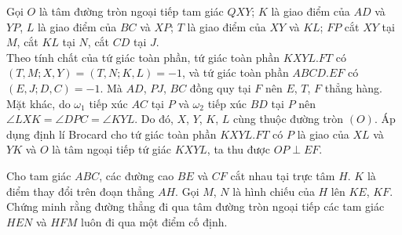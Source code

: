         \begin{solution}
            Gọi \(O\) là tâm đường tròn ngoại tiếp tam giác \(QXY\); \(K\) là giao điểm của \(AD\) và \(YP\), \(L\) là giao điểm của \(BC\) và \(XP\); \(T\) là giao điểm của \(XY\) và \(KL\); \(FP\) cắt \(XY\) tại \(M\), cắt \(KL\) tại \(N\), cắt \(CD\) tại \(J\).\\
            Theo tính chất của tứ giác toàn phần, tứ giác toàn phần \(KXYL.FT\) có \((T,M;X,Y) = (T,N;K,L) = -1\), và tứ giác toàn phần \(ABCD.EF\) có \((E,J;D,C) = -1\). Mà \(AD\), \(PJ\), \(BC\) đồng quy tại \(F\) nên \(E\), \(T\), \(F\) thẳng hàng.\\
            Mặt khác, do \(\omega_1\) tiếp xúc \(AC\) tại \(P\) và \(\omega_2\) tiếp xúc \(BD\) tại \(P\) nên \(\angle LXK = \angle DPC = \angle KYL\). Do đó, \(X\), \(Y\), \(K\), \(L\) cùng thuộc đường tròn \((O)\). Áp dụng định lí Brocard cho tứ giác toàn phần \(KXYL.FT\) có \(P\) là giao của \(XL\) và \(YK\) và \(O\) là tâm ngoại tiếp tứ giác \(KXYL\), ta thu được \(OP \perp EF\).
        \end{solution}

        \begin{problem}
            Cho tam giác \(ABC\), các đường cao \(BE\) và \(CF\) cắt nhau tại trực tâm \(H\). \(K\) là điểm thay đổi trên đoạn thẳng \(AH\). Gọi \(M\), \(N\) là hình chiếu của \(H\) lên \(KE\), \(KF\). Chứng minh rằng đường thẳng đi qua tâm đường tròn ngoại tiếp các tam giác \(HEN\) và \(HFM\) luôn đi qua một điểm cố định.
        \end{problem}


